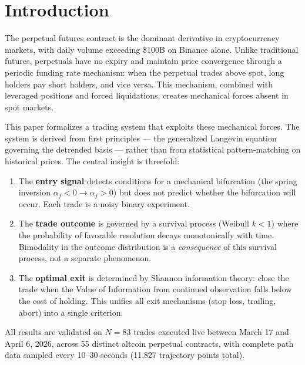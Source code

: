 \documentclass[11pt,a4paper]{article}
\newcommand{\af}{\alpha_f}
\begin{document}
\tableofcontents
\newpage

\section{Introduction}
\label{sec:intro}

The perpetual futures contract is the dominant derivative in cryptocurrency markets, with daily volume exceeding \$100B on Binance alone. Unlike traditional futures, perpetuals have no expiry and maintain price convergence through a periodic funding rate mechanism: when the perpetual trades above spot, long holders pay short holders, and vice versa. This mechanism, combined with leveraged positions and forced liquidations, creates mechanical forces absent in spot markets.

This paper formalizes a trading system that exploits these mechanical forces. The system is derived from first principles --- the generalized Langevin equation governing the detrended basis --- rather than from statistical pattern-matching on historical prices. The central insight is threefold:

\begin{enumerate}[leftmargin=2em]
\item The \textbf{entry signal} detects conditions for a mechanical bifurcation (the spring inversion $\af < 0 \to \af > 0$) but does not predict whether the bifurcation will occur. Each trade is a noisy binary experiment.
\item The \textbf{trade outcome} is governed by a survival process (Weibull $k < 1$) where the probability of favorable resolution decays monotonically with time. Bimodality in the outcome distribution is a \emph{consequence} of this survival process, not a separate phenomenon.
\item The \textbf{optimal exit} is determined by Shannon information theory: close the trade when the Value of Information from continued observation falls below the cost of holding. This unifies all exit mechanisms (stop loss, trailing, abort) into a single criterion.
\end{enumerate}

All results are validated on $N=83$ trades executed live between March 17 and April 6, 2026, across 55 distinct altcoin perpetual contracts, with complete path data sampled every 10--30 seconds (11,827 trajectory points total).
\end{document}
